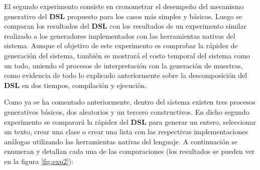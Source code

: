 El segundo experimento consiste en cronometrar el desempeño del mecanismo generativo del {\bf DSL} propuesto para los casos más simples y
básicos. Luego se comparan los resultados del {\bf DSL} con los resultados de un experimento similar realizado a los generadores implementados
con las herramientas nativas del sistema. Aunque el objetivo de este experimento es comprobar la rápidez de generación del sistema,
también se mostrará el costo temporal del sistema como un todo, uniendo el procesos de interpretación con la generación de muestras,
como evidencia de todo lo explicado anteriormente sobre la descomposición del {\bf DSL} en dos tiempos, compilación y ejecución.

Como ya se ha comentado anteriormente, dentro del sistema existen tres procesos generativos básicos, dos aleatorios y un tercero
constructivos. En dicho segundo experimento se comparará la rápidez del {\bf DSL} para generar un entero, seleccionar un texto, crear una
clase o crear una lista con las respectivas implementaciones análogas utilizando las herramientas nativas del lenguaje. A continuación
se enumeran y detallan cada una de las comparaciones (los resultados se pueden ver en la figura \ref{fig:exp2}):
